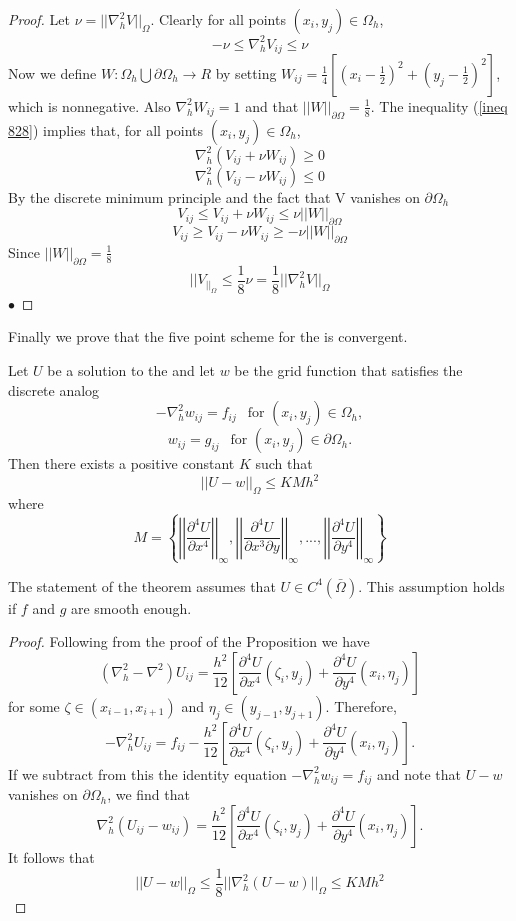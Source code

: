 \begin{proof}
Let $\nu = ||\nabla_{h}^2V||_{\Omega}$. Clearly for all points $(x_i,y_j)\in\Omega_h$,
\begin{equation}\label{ineq 828}
-\nu \leq \nabla_{h}^2V_{ij} \leq \nu \end{equation}
Now we define $W:\Omega_h \bigcup \partial\Omega_h \rightarrow R$ by setting 
$W_{ij}=\frac{1}{4}[(x_i-\frac{1}{2})^2+(y_j-\frac{1}{2})^2]$, which is nonnegative.  Also $\nabla_h^2W_{ij}=1$ and that $||W||_{\partial\Omega}=\frac{1}{8}$.
The inequality (\ref{ineq 828}) implies that, for all points $(x_i,y_j)\in\Omega_h$,
\[\nabla_h^2(V_{ij}+\nu W_{ij})\geq 0 \]
\[\nabla_h^2(V_{ij}-\nu W_{ij})\leq 0 \]
By the discrete minimum principle and the fact that V vanishes on $\partial\Omega_h$
\[V_{ij}\leq V_{ij}+\nu W_{ij}\leq \nu||W||_{\partial\Omega} \]
\[V_{ij}\geq V_{ij}-\nu W_{ij}\geq -\nu||W||_{\partial\Omega} \]
Since $||W||_{\partial\Omega}=\frac{1}{8}$
\[||V_||_{\Omega}\leq \frac{1}{8}\nu =\frac{1}{8}||\nabla_h^2V||_{\Omega} \]
$\bullet$\end{proof}
Finally we prove that the five point scheme for the  is convergent.
\begin{theorem}
Let $U$ be a solution to the  and let $w$ be the grid function
that satisfies the discrete analog
\[-\nabla_h^2w_{ij}=f_{ij} \ \ \mbox{ for } (x_i,y_j)\in\Omega_h, \]
\[w_{ij}=g_{ij} \ \ \mbox{ for } (x_i,y_j)\in\partial\Omega_h. \]
Then there exists a positive constant $K$ such that
\[||U-w||_{\Omega}\leq KMh^2 \]
where
\[ M=\left\{
\left|\left|\frac{\partial^4 U}{\partial x^4} \right|\right|_{\infty},
\left|\left|\frac{\partial^4 U}{\partial x^3\partial y} \right|\right|_{\infty},
...,
\left|\left|\frac{\partial^4 U}{\partial y^4} \right|\right|_{\infty}
 \right\}
\]
\end{theorem}
The statement of the theorem assumes that $U\in C^4(\bar{\Omega})$. This assumption
holds if $f$ and $g$ are smooth enough.
\begin{proof}
Following from the proof of the Proposition we have
\[ (\nabla_h^2-\nabla^2)U_{ij}=\frac{h^2}{12}\left[ \frac{\partial^4 U}{\partial x^4}(\zeta_i,y_j)+\frac{\partial^4 U}{\partial y^4}(x_i,\eta_j) \right]\]
for some $\zeta \in (x_{i-1},x_{i+1})$ and $\eta_j\in(y_{j-1},y_{j+1})$.  Therefore,
\[ -\nabla_h^2U_{ij}=f_{ij}-\frac{h^2}{12}\left[ \frac{\partial^4 U}{\partial x^4}(\zeta_i,y_j)+\frac{\partial^4 U}{\partial y^4}(x_i,\eta_j) \right].\]
If we subtract from this the identity equation $-\nabla_h^2w_{ij}=f_{ij}$ and note
that $U-w$ vanishes on $\partial\Omega_h$, we find that
\[ \nabla_h^2(U_{ij}-w_{ij})=\frac{h^2}{12}\left[ \frac{\partial^4 U}{\partial x^4}(\zeta_i,y_j)+\frac{\partial^4 U}{\partial y^4}(x_i,\eta_j) \right].\]
It follows that
\[ ||U-w||_{\Omega}\leq\frac{1}{8}||\nabla_h^2(U-w)||_{\Omega}\leq KMh^2\]
\end{proof}